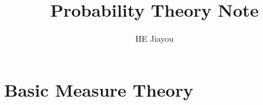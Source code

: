 \documentclass[]{report}
\title{Probability Theory Note}
\author{HE Jiayou}
\begin{document}
\maketitle
\tableofcontents

\chapter{Basic Measure Theory}
\end{document}
